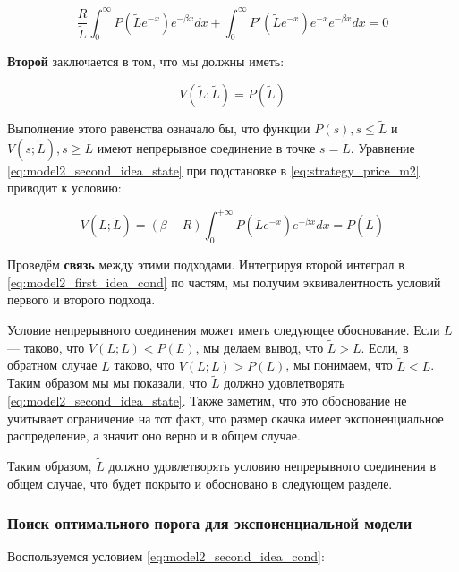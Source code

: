 \documentclass[a4paper,12pt]{article}
\theoremstyle{definition}
\begin{document}
\begin{equation}\label{eq:model2_first_idea_cond}
    \frac{R}{\tilde{L}} \int_{0}^{\infty} P(\tilde{L} e^{-x}) e^{-\beta x} dx + \int_{0}^{\infty} P'(\tilde{L} e^{-x}) e^{-x} e^{-\beta x} dx = 0
\end{equation}

\textbf{Второй} заключается в том, что мы должны иметь:

\begin{equation}\label{eq:model2_second_idea_state}
    V(\tilde{L}; \tilde{L}) = P(\tilde{L})
\end{equation}

Выполнение этого равенства означало бы, что функции $P(s), s \le \tilde{L}$ и $V(s; \tilde{L}), s \ge \tilde{L}$ имеют непрерывное соединение в точке $s = \tilde{L}$. Уравнение \eqref{eq:model2_second_idea_state} при подстановке в \eqref{eq:strategy_price_m2} приводит к условию:

\begin{equation}\label{eq:model2_second_idea_cond}
    V(\tilde{L}; \tilde{L}) = (\beta - R) \int_{0}^{+\infty} P(\tilde{L} e^{-x}) e^{-\beta x} dx = P(\tilde{L})
\end{equation}

Проведём \textbf{связь} между этими подходами. Интегрируя второй интеграл в \eqref{eq:model2_first_idea_cond} по частям, мы получим эквивалентность условий первого и второго подхода.

Условие непрерывного соединения может иметь следующее обоснование. Если $L$ --- таково, что $V(L; L) < P(L)$, мы делаем вывод, что $\tilde{L} > L$. Если, в обратном случае $L$ таково, что $V(L; L) > P(L)$, мы понимаем, что $\tilde{L} < L$. Таким образом мы мы показали, что $\tilde{L}$ должно удовлетворять \eqref{eq:model2_second_idea_state}. Также заметим, что это обоснование не учитывает ограничение на тот факт, что размер скачка имеет экспоненциальное распределение, а значит оно верно и в общем случае.

Таким образом, $\tilde{L}$ должно удовлетворять условию непрерывного соединения в общем случае, что будет покрыто и обосновано в следующем разделе.

\subsubsection{Поиск оптимального порога для экспоненциальной модели}

Воспользуемся условием \eqref{eq:model2_second_idea_cond}:
\end{document}
